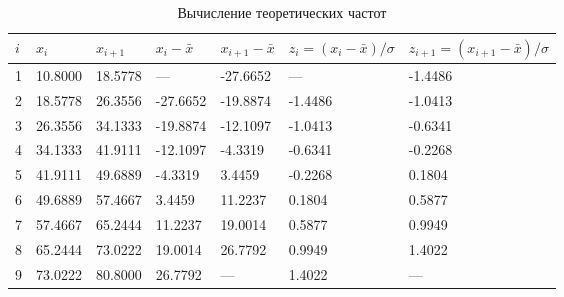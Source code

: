 \documentclass{article}
\theoremstyle{problemstyle}
\begin{document}
\begin{table}[H]
	\centering
	\begin{tabular}{|l|l|l|l|l|l|l|}
		\hline
		\(i\) & \(x_i\)                        & \(x_{i+1}\)                             & \(x_i - \bar x\) & \(x_{i+1} - \bar x\)
		      & \(z_i = (x_i -\bar x)/\sigma\) & \(z_{i+1} = (x_{i+1} - \bar x)/\sigma\)                                                               \\
		\hline
		1     & 10.8000                        & 18.5778                                 & ---              & -27.6652             & ---     & -1.4486 \\
		\hline
		2     & 18.5778                        & 26.3556                                 & -27.6652         & -19.8874             & -1.4486 & -1.0413 \\
		\hline
		3     & 26.3556                        & 34.1333                                 & -19.8874         & -12.1097             & -1.0413 & -0.6341 \\
		\hline
		4     & 34.1333                        & 41.9111                                 & -12.1097         & -4.3319              & -0.6341 & -0.2268 \\
		\hline
		5     & 41.9111                        & 49.6889                                 & -4.3319          & 3.4459               & -0.2268 & 0.1804  \\
		\hline
		6     & 49.6889                        & 57.4667                                 & 3.4459           & 11.2237              & 0.1804  & 0.5877  \\
		\hline
		7     & 57.4667                        & 65.2444                                 & 11.2237          & 19.0014              & 0.5877  & 0.9949  \\
		\hline
		8     & 65.2444                        & 73.0222                                 & 19.0014          & 26.7792              & 0.9949  & 1.4022  \\
		\hline
		9     & 73.0222                        & 80.8000                                 & 26.7792          & ---                  & 1.4022  & ---     \\
		\hline
	\end{tabular}
	\caption{Вычисление теоретических частот}\label{table:theoretical}
\end{table}
\end{document}
